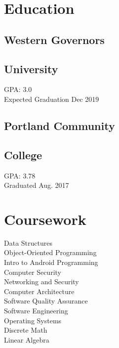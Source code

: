\documentclass[letterpaper]{deedy-resume} %
\begin{document}
\begin{minipage}[t]{0.33\textwidth}
\sectionspace %



\section{Education} 

\subsection{Western Governors}
\subsection{University}
GPA: 3.0\\
Expected Graduation Dec 2019\\

\sectionspace %

\subsection{Portland Community}
\subsection{College}
GPA: 3.78\\
Graduated Aug. 2017\\

\sectionspace %



\section{Coursework}

Data Structures\\
Object-Oriented Programming\\
Intro to Android Programming\\
Computer Security\\
Networking and Security\\
Computer Architecture\\
Software Quality Assurance\\
Software Engineering\\
Operating Systems\\
Discrete Math\\
Linear Algebra


\end{minipage}
\end{document}
